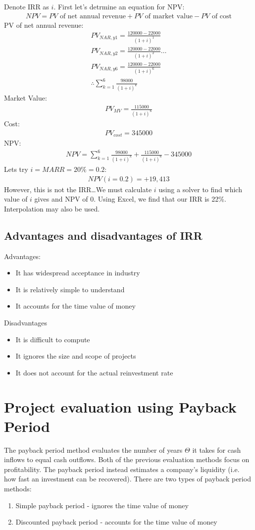 \documentclass[class=report, crop=false, 12pt,a4paper]{standalone}
\begin{document}
Denote IRR as $i$. First let's detrmine an equation for NPV:
\begin{gather}
	NPV = PV \textrm{ of net annual revenue} + PV \textrm{ of market value} - PV \textrm{ of cost}
\end{gather}
PV of net annual revenue:
\begin{gather}
	PV_{NAR,y1} = \frac{120000-22000}{(1+i)^1}\\
	PV_{NAR,y2} = \frac{120000-22000}{(1+i)^2}\dots\\
	PV_{NAR,y6} = \frac{120000-22000}{(1+i)^6}\\
	\therefore \sum_{k=1}^6 \frac{98000}{(1+i)^k}
\end{gather}
Market Value:
\begin{gather}
	PV_{MV} = \frac{115000}{(1+i)^6}
\end{gather}
Cost:
\begin{gather}
	PV_{cost} = 345000
\end{gather}
NPV:
\begin{gather}
	NPV = \sum_{k=1}^6 \frac{98000}{(1+i)^k} + \frac{115000}{(1+i)^6} - 345000
\end{gather}
Lets try $i = MARR = 20\% = 0.2$:
\begin{gather}
	NPV(i=0.2) = + 19,413
\end{gather}
However, this is not the IRR\dots We must calculate $i$ using a solver to find which value of $i$ gives and NPV of 0. Using Excel, we find that our IRR is 22\%. Interpolation may also be used. 
\subsection{Advantages and disadvantages of IRR}
Advantages:
\begin{itemize}
	\item It has widespread acceptance in industry
	\item It is relatively simple to understand
	\item It accounts for the time value of money
\end{itemize}
Disadvantages
\begin{itemize}
	\item It is difficult to compute
	\item It ignores the size and scope of projects
	\item It does not account for the actual reinvestment rate
\end{itemize}
\section{Project evaluation using Payback Period}
The payback period method evaluates the number of years $\Theta$ it takes for cash inflows to equal cash outflows. Both of the previous evaluation methods focus on profitability. The payback period instead estimates a company's liquidity (i.e. how fast an investment can be recovered). There are two types of payback period methods:
\begin{enumerate}
	\item Simple payback period - ignores the time value of money
	\item Discounted payback period - accounts for the time value of money
\end{enumerate}
\end{document}
